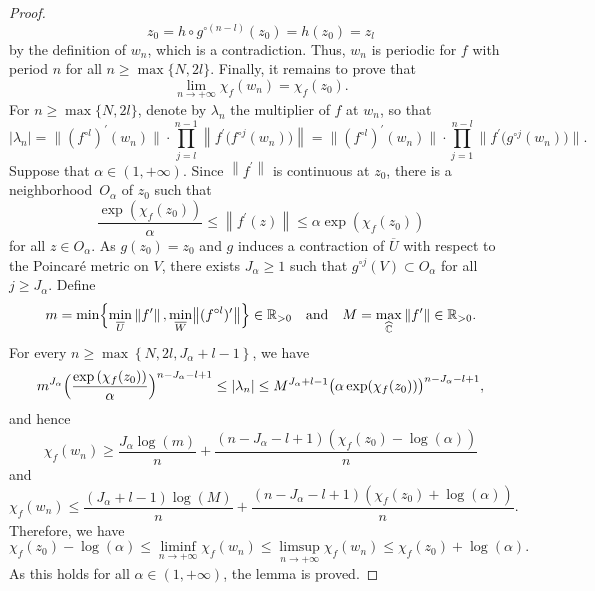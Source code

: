 \documentclass[JEP,XML,SOM,Unicode,published]{cedram}
\theoremstyle{plain}
\theoremstyle{definition}
\theoremstyle{remark}
\begin{document}
\begin{proof}
\[
z_{0} = h \circ g^{\circ (n -l)}(z_{0}) = h(z_{0}) = z_{l}
\]
by the definition of $w_{n}$, which is a contradiction. Thus, $w_{n}$ is periodic for $f$ with period $n$ for all $n \geq \max\lbrace N, 2 l \rbrace$. Finally, it remains to prove that
\[
\lim_{n \to +\infty} \chi_{f}(w_{n}) = \chi_{f}(z_{0}).
\]
For $n \geq \max\lbrace N, 2 l \rbrace$, denote by $\lambda_{n}$ the multiplier of $f$ at $w_{n}$, so that
\[
\left\lvert \lambda_{n} \right\rvert = \bigl\lVert(f^{\circ l})^{\prime}(w_{n}) \bigr\rVert \cdot \prod_{j = l}^{n -1} \left\lVert f^{\prime}\bigl(f^{\circ j}(w_{n}) \bigr) \right\rVert = \bigl\lVert(f^{\circ l})^{\prime}(w_{n}) \bigr\rVert \cdot \prod_{j = 1}^{n -l} \bigl\lVert f^{\prime}\bigl(g^{\circ j}(w_{n}) \bigr) \bigr\rVert.
\]
Suppose that $\alpha \in (1, +\infty)$. Since $\left\lVert f^{\prime} \right\rVert$ is continuous at $z_{0}$, there is a neighborhood~$O_{\alpha}$ of $z_{0}$ such that
\[
\frac{\exp\left(\chi_{f}(z_{0}) \right)}{\alpha} \leq \left\lVert f^{\prime}(z) \right\rVert \leq \alpha \exp\left(\chi_{f}(z_{0}) \right)
\]
for all $z \in O_{\alpha}$. As $g(z_{0}) = z_{0}$ and $g$ induces a contraction of $\overline{U}$ with respect to the Poincaré metric on $V$, there exists $J_{\alpha} \geq 1$ such that $g^{\circ j}(V) \subset O_{\alpha}$ for all $j \geq J_{\alpha}$. Define
\[
m = \min\Bigl\lbrace \min_{\overline{U}} \left\lVert f^{\prime} \right\rVert, \min_{\overline{W}} \bigl\lVert(f^{\circ l})^{\prime} \bigr\rVert \Bigr\rbrace \in \mathbb{R}_{> 0} \quad \text{and} \quad M = \max_{\widehat{\mathbb{C}}} \left\lVert f^{\prime} \right\rVert \in \mathbb{R}_{> 0}.
\]
For every $n \geq \max\left\lbrace N, 2 l, J_{\alpha} +l -1 \right\rbrace$, we have
\[
m^{J_{\alpha}} \Bigl(\frac{\exp\left(\chi_{f}(z_{0}) \right)}{\alpha} \Bigr)^{n -J_{\alpha} -l +1} \leq \left\lvert \lambda_{n} \right\rvert \leq M^{J_{\alpha} +l -1} \bigl(\alpha \exp(\chi_{f}(z_{0})) \bigr)^{n -J_{\alpha} -l +1},
\]
and hence
\[
\chi_{f}(w_{n}) \geq \frac{J_{\alpha} \log(m)}{n} +\frac{\left(n -J_{\alpha} -l +1 \right) \left(\chi_{f}(z_{0}) -\log(\alpha) \right)}{n}
\]
and
\[
\chi_{f}(w_{n}) \leq \frac{\left(J_{\alpha} +l -1 \right) \log(M)}{n} +\frac{\left(n -J_{\alpha} -l +1 \right) \left(\chi_{f}(z_{0}) +\log(\alpha) \right)}{n}.
\]
Therefore, we have
\[
\chi_{f}(z_{0}) -\log(\alpha) \leq \liminf_{n \to +\infty} \chi_{f}(w_{n}) \leq \limsup_{n \to +\infty} \chi_{f}(w_{n}) \leq \chi_{f}(z_{0}) +\log(\alpha).
\]
As this holds for all $\alpha \in (1, +\infty)$, the lemma is proved.
\end{proof}
\end{document}
